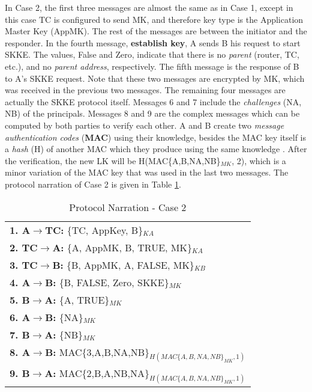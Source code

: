 In Case 2, the first three messages are almost the same as in Case 1, 
except in this case TC is configured to send MK, and therefore key type is the Application Master Key (AppMK). 
The rest of the messages are between the initiator and the responder. 
In the fourth message, \textbf{establish key}, A sends B his request to start SKKE. 
The values, False and Zero, indicate that there is no \emph{parent} (router, TC, etc.), and no \emph{parent address}, respectively. 
The fifth message is the response of B to A's SKKE request. 
Note that these two messages are encrypted by MK, which was received in the previous two messages. 
The remaining four messages are actually the SKKE protocol itself.
Messages 6 and 7 include the \emph{challenges} (NA, NB) of the principals. 
Messages 8 and 9 are the complex messages which can be computed by both parties to verify each other.
A and B create two \emph{message authentication codes} (\textbf{MAC}) 
using their knowledge, besides the MAC key itself is a \emph{hash} (H) of another MAC which they produce using the same knowledge \cite{HMAC}. 
After the verification, the new LK will be H(MAC\{A,B,NA,NB\}$_{MK}$, 2), which is a minor variation of the MAC key that was used in the last two messages.
The protocol narration of Case 2 is given in Table \ref{tab:protocolnarration2}.

\begin{table}\caption{Protocol Narration - Case 2}
\label{tab:protocolnarration2}
\centering
\begin{tabular}{l}  
\hline
\textbf{1. A\(\rightarrow\)TC:} \{TC, AppKey, B\}$_{KA}$   \\
\textbf{2. TC\(\rightarrow\)A:} \{A, AppMK, B, TRUE, MK\}$_{KA}$ \\
\textbf{3. TC\(\rightarrow\)B:} \{B, AppMK, A, FALSE, MK\}$_{KB}$ \\
\textbf{4. A\(\rightarrow\)B:} \{B, FALSE, Zero, SKKE\}$_{MK}$ \\
\textbf{5. B\(\rightarrow\)A:} \{A, TRUE\}$_{MK}$                 \\                           
\textbf{6. A\(\rightarrow\)B:} \{NA\}$_{MK}$      \\                
\textbf{7. B\(\rightarrow\)A:} \{NB\}$_{MK}$                  \\                       
\textbf{8. A\(\rightarrow\)B:} MAC\{3,A,B,NA,NB\}$_{H(MAC\{A,B,NA,NB\}_{MK},1)}$        \\
\textbf{9. B\(\rightarrow\)A:} MAC\{2,B,A,NB,NA\}$_{H(MAC\{A,B,NA,NB\}_{MK},1)}$        \\
\hline
\end{tabular}
\end{table}

